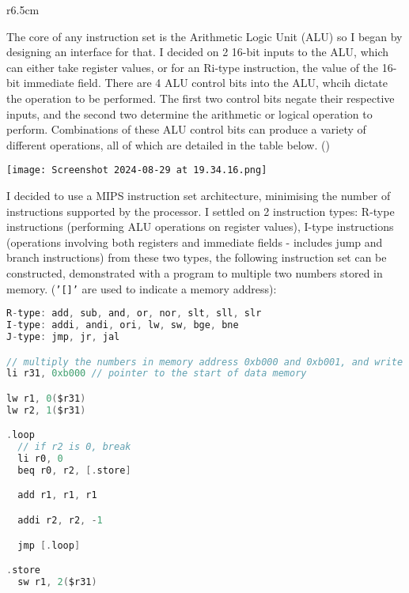 \needspace{100pt}


\begin{wrapfigure}[10]{r}{6.5cm}
\end{wrapfigure}

The core of any instruction set is the Arithmetic Logic Unit (ALU) so I began by designing an interface for that. I decided on 2 16-bit inputs to the ALU, which can either take register values, or for an Ri-type instruction, the value of the 16-bit immediate field. There are 4 ALU control bits into the ALU, whcih dictate the operation to be performed. The first two control bits negate their respective inputs, and the second two determine the arithmetic or logical operation to perform. Combinations of these ALU control bits can produce a variety of different operations, all of which are detailed in the table below. (\cite{EOCS})

\bigskip

\begin{center}
  \texttt{[image: Screenshot 2024-08-29 at 19.34.16.png]}
\end{center}


I decided to use a MIPS instruction set architecture, minimising the number of instructions supported by the processor. I settled on 2 instruction types: R-type instructions (performing ALU operations on register values), I-type instructions (operations involving both registers and immediate fields - includes jump and branch instructions) from these two types, the following instruction set can be constructed, demonstrated with a program to multiple two numbers stored in memory. (\texttt{'[]'} are used to indicate a memory address):

\begin{lstlisting}[language=C]
R-type: add, sub, and, or, nor, slt, sll, slr
I-type: addi, andi, ori, lw, sw, bge, bne
J-type: jmp, jr, jal

// multiply the numbers in memory address 0xb000 and 0xb001, and write the answer to 0xb002
li r31, 0xb000 // pointer to the start of data memory

lw r1, 0($r31)
lw r2, 1($r31)

.loop
  // if r2 is 0, break
  li r0, 0
  beq r0, r2, [.store]

  add r1, r1, r1

  addi r2, r2, -1

  jmp [.loop]

.store
  sw r1, 2($r31)
\end{lstlisting}

